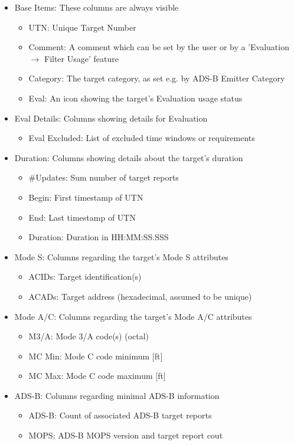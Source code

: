 \begin{itemize}  
\item Base Items: These columns are always visible
\begin{itemize}  
  \item UTN: Unique Target Number
  \item Comment: A comment which can be set by the user or by a 'Evaluation $\rightarrow$ Filter Usage' feature
  \item Category: The target category, as set e.g. by ADS-B Emitter Category
  \item Eval: An icon showing the target's Evaluation usage status
\end{itemize}
\item Eval Details: Columns showing details for Evaluation
\begin{itemize}  
  \item Eval Excluded: List of excluded time windows or requirements
\end{itemize}
\item Duration: Columns showing details about the target's duration
\begin{itemize}  
  \item \#Updates: Sum number of target reports 
  \item Begin: First timestamp of UTN
  \item End: Last timestamp of UTN
  \item Duration: Duration in HH:MM:SS.SSS
\end{itemize}
\item Mode S: Columns regarding the target's Mode S attributes
\begin{itemize}  
  \item ACIDs: Target identification(s)
  \item ACADs: Target address (hexadecimal, assumed to be unique)
\end{itemize}
\item Mode A/C: Columns regarding the target's Mode A/C attributes
\begin{itemize}  
  \item M3/A: Mode 3/A code(s) (octal)
  \item MC Min: Mode C code minimum [ft]
  \item MC Max: Mode C code maximum [ft]
\end{itemize}
\item ADS-B: Columns regarding minimal ADS-B information
\begin{itemize}  
  \item ADS-B: Count of associated ADS-B target reports
  \item MOPS: ADS-B MOPS version and target report cout
\end{itemize}
\end{itemize}
\ \\

